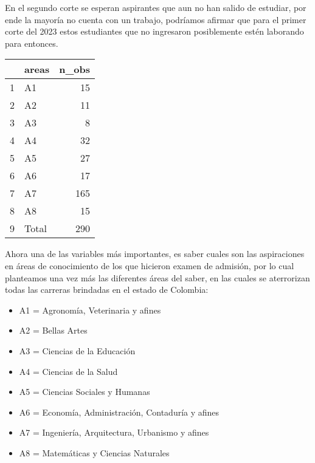 \documentclass[
]{article}
\newenvironment{Shaded}{\begin{snugshade}}{\end{snugshade}}
\newcommand{\AttributeTok}[1]{\textcolor[rgb]{0.77,0.63,0.00}{#1}}
\newcommand{\CommentTok}[1]{\textcolor[rgb]{0.56,0.35,0.01}{\textit{#1}}}
\newcommand{\ConstantTok}[1]{\textcolor[rgb]{0.00,0.00,0.00}{#1}}
\newcommand{\FunctionTok}[1]{\textcolor[rgb]{0.00,0.00,0.00}{#1}}
\newcommand{\NormalTok}[1]{#1}
\newcommand{\OtherTok}[1]{\textcolor[rgb]{0.56,0.35,0.01}{#1}}
\newcommand{\StringTok}[1]{\textcolor[rgb]{0.31,0.60,0.02}{#1}}
\begin{document}
En el segundo corte se esperan aspirantes que aun no han salido de
estudiar, por ende la mayoría no cuenta con un trabajo, podríamos
afirmar que para el primer corte del 2023 estos estudiantes que no
ingresaron posiblemente estén laborando para entonces.

\begin{Shaded}
\end{Shaded}

\begin{table}[ht]
\centering
\begin{tabular}{rlr}
  \hline
 & areas & n\_obs \\ 
  \hline
1 & A1 &  15 \\ 
  2 & A2 &  11 \\ 
  3 & A3 &   8 \\ 
  4 & A4 &  32 \\ 
  5 & A5 &  27 \\ 
  6 & A6 &  17 \\ 
  7 & A7 & 165 \\ 
  8 & A8 &  15 \\ 
  9 & Total & 290 \\ 
   \hline
\end{tabular}
\end{table}

Ahora una de las variables más importantes, es saber cuales son las
aspiraciones en áreas de conocimiento de los que hicieron examen de
admisión, por lo cual planteamos una vez más las diferentes áreas del
saber, en las cuales se aterrorizan todas las carreras brindadas en el
estado de Colombia:

\begin{itemize}
\item
  A1 = Agronomía, Veterinaria y afines
\item
  A2 = Bellas Artes
\item
  A3 = Ciencias de la Educación
\item
  A4 = Ciencias de la Salud
\item
  A5 = Ciencias Sociales y Humanas
\item
  A6 = Economía, Administración, Contaduría y afines
\item
  A7 = Ingeniería, Arquitectura, Urbanismo y afines
\item
  A8 = Matemáticas y Ciencias Naturales
\end{itemize}
\end{document}
